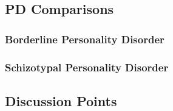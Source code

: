 \documentclass[xcolor=x11names,compress]{beamer}\usepackage[]{graphicx}\usepackage[]{color}
\renewcommand{\(}{\begin{columns}}
\renewcommand{\)}{\end{columns}}
\newcommand{\<}[1]{\begin{column}{#1}}
\renewcommand{\>}{\end{column}}
\begin{document}
\subsection{PD Comparisons}
\subsubsection{Borderline Personality Disorder}
\subsubsection{Schizotypal Personality Disorder}


\subsection{Discussion Points}



\end{document}
